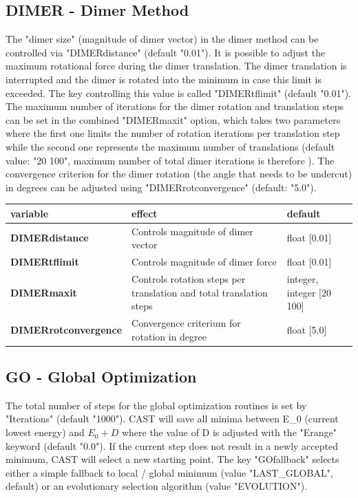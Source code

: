 \documentclass[10pt,a4paper]{article} %
\begin{document}
	\subsection{DIMER - Dimer Method}
	The "dimer size" (magnitude of dimer vector) in the dimer method\supercite{dimermethod} can be controlled via "DIMERdistance" (default "0.01").
	It is possible to adjust the maximum rotational force during the dimer translation. The dimer translation is interrupted and the dimer is rotated into the minimum in case this limit is exceeded. The key controlling this value is called "DIMERtflimit" (default "0.01").
	The maximum number of iterations for the dimer rotation and translation steps can be set in the combined "DIMERmaxit" option, which takes two parameters where the first one limits the number of rotation iterations per translation step while the second one represents the maximum number of translations (default value: "20 100", maximum number of total dimer iterations is therefore ).
	The convergence criterion for the dimer rotation (the angle that needs to be undercut) in degrees can be adjusted using "DIMERrotconvergence" (default: "5.0").

	\begin{tabularx}{\textwidth}{l|X|X}
		variable & effect & default \\
		\hline
		\textbf{DIMERdistance} & Controls magnitude of dimer vector & float [0.01] \\
		\textbf{DIMERtflimit} & Controls magnitude of dimer force & float [0.01] \\
		\textbf{DIMERmaxit}& Controls rotation steps per translation and total translation steps & integer, integer [20 100]\\
		\textbf{DIMERrotconvergence} & Convergence criterium for rotation in degree & float [5.0] \\
	\end{tabularx}

	\subsection{GO - Global Optimization}
	The total number of steps for the global optimization routines is set by "Iterations" (default "1000"). \ac{CAST} will save all minima between E_0 (current lowest energy) and $E_0 + D$ where the value of D is adjusted with the "Erange" keyword (default "0.0").
	If the current step does not result in a newly accepted minimum, \ac{CAST} will select a new starting point. The key "GOfallback" selects either a simple fallback to local / global minimum (value "LAST_GLOBAL", default) or an evolutionary selection algorithm (value "EVOLUTION").
\end{document}
